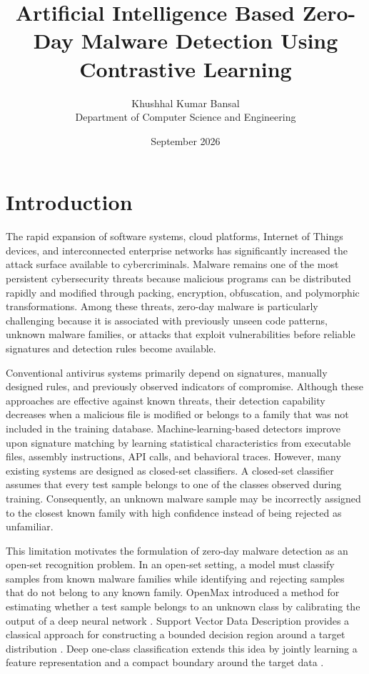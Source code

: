 \documentclass[12pt,a4paper]{article}
\begin{document}
\title{
    \textbf{Artificial Intelligence Based Zero-Day Malware Detection Using Contrastive Learning}
}

\author{
    Khushhal Kumar Bansal\\
    Department of Computer Science and Engineering
}

\date{September 2026}

\maketitle

\section{Introduction}

The rapid expansion of software systems, cloud platforms, Internet of Things devices, and interconnected enterprise networks has significantly increased the attack surface available to cybercriminals. Malware remains one of the most persistent cybersecurity threats because malicious programs can be distributed rapidly and modified through packing, encryption, obfuscation, and polymorphic transformations. Among these threats, zero-day malware is particularly challenging because it is associated with previously unseen code patterns, unknown malware families, or attacks that exploit vulnerabilities before reliable signatures and detection rules become available.

Conventional antivirus systems primarily depend on signatures, manually designed rules, and previously observed indicators of compromise. Although these approaches are effective against known threats, their detection capability decreases when a malicious file is modified or belongs to a family that was not included in the training database. Machine-learning-based detectors improve upon signature matching by learning statistical characteristics from executable files, assembly instructions, API calls, and behavioral traces. However, many existing systems are designed as closed-set classifiers. A closed-set classifier assumes that every test sample belongs to one of the classes observed during training. Consequently, an unknown malware sample may be incorrectly assigned to the closest known family with high confidence instead of being rejected as unfamiliar.

This limitation motivates the formulation of zero-day malware detection as an open-set recognition problem. In an open-set setting, a model must classify samples from known malware families while identifying and rejecting samples that do not belong to any known family. OpenMax introduced a method for estimating whether a test sample belongs to an unknown class by calibrating the output of a deep neural network \citep{bendale2016}. Support Vector Data Description provides a classical approach for constructing a bounded decision region around a target distribution \citep{tax2004}. Deep one-class classification extends this idea by jointly learning a feature representation and a compact boundary around the target data \citep{ruff2018}.
\end{document}
